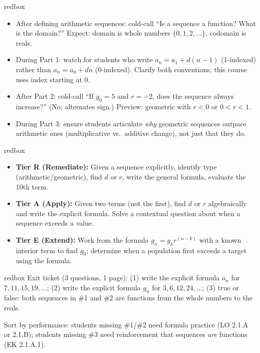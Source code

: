 \documentclass[10pt]{article}
\begin{document}
\begin{skillbox}{redbox}
\begin{itemize}[leftmargin=1.2em,itemsep=2pt,topsep=0pt]
  \item After defining arithmetic sequences: cold-call ``Is a sequence a function? What is the domain?''
        Expect: domain is whole numbers $\{0, 1, 2, \ldots\}$, codomain is reals.
  \item During Part 1: watch for students who write $a_n = a_1 + d(n-1)$ (1-indexed) rather than
        $a_n = a_0 + dn$ (0-indexed). Clarify both conventions; this course uses index starting at 0.
  \item After Part 2: cold-call ``If $g_0 = 5$ and $r = -2$, does the sequence always increase?''
        (No; alternates sign.) Preview: geometric with $r < 0$ or $0 < r < 1$.
  \item During Part 3: ensure students articulate \textit{why} geometric sequences outpace arithmetic
        ones (multiplicative vs.\ additive change), not just that they do.
\end{itemize}
\end{skillbox}

\begin{skillbox}{redbox}
\begin{itemize}[leftmargin=1.2em,itemsep=2pt,topsep=0pt]
  \item \textbf{Tier R (Remediate):} Given a sequence explicitly, identify type (arithmetic/geometric),
        find $d$ or $r$, write the general formula, evaluate the 10th term.
  \item \textbf{Tier A (Apply):} Given two terms (not the first), find $d$ or $r$ algebraically and
        write the explicit formula. Solve a contextual question about when a sequence exceeds a value.
  \item \textbf{Tier E (Extend):} Work from the formula $g_n = g_k r^{(n-k)}$ with a known interior
        term to find $g_0$; determine when a population first exceeds a target using the formula.
\end{itemize}
\end{skillbox}

\begin{skillbox}{redbox}
Exit ticket (3 questions, 1 page): (1) write the explicit formula $a_n$ for $7, 11, 15, 19, \ldots$;
(2) write the explicit formula $g_n$ for $3, 6, 12, 24, \ldots$;
(3) true or false: both sequences in \#1 and \#2 are functions from the whole numbers to the reals.

Sort by performance: students missing \#1/\#2 need formula practice (LO 2.1.A or 2.1.B);
students missing \#3 need reinforcement that sequences \textit{are} functions (EK 2.1.A.1).
\end{skillbox}
\end{document}
